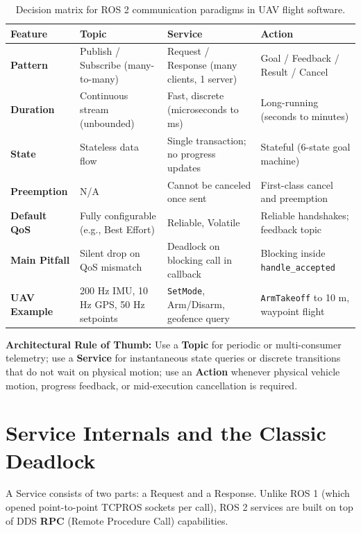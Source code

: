 \documentclass{article}
\begin{document}
\begin{table}[h]
\centering
\small
\renewcommand{\arraystretch}{1.2}
\begin{tabularx}{\textwidth}{lXXX}
\toprule
\textbf{Feature} & \textbf{Topic} & \textbf{Service} & \textbf{Action} \\
\midrule
\textbf{Pattern} & Publish / Subscribe (many-to-many) & Request / Response (many clients, 1 server) & Goal / Feedback / Result / Cancel \\
\textbf{Duration} & Continuous stream (unbounded) & Fast, discrete (microseconds to ms) & Long-running (seconds to minutes) \\
\textbf{State} & Stateless data flow & Single transaction; no progress updates & Stateful (6-state goal machine) \\
\textbf{Preemption} & N/A & Cannot be canceled once sent & First-class cancel and preemption \\
\textbf{Default QoS} & Fully configurable (e.g., Best Effort) & Reliable, Volatile & Reliable handshakes; feedback topic \\
\textbf{Main Pitfall} & Silent drop on QoS mismatch & Deadlock on blocking call in callback & Blocking inside \texttt{handle\_accepted} \\
\textbf{UAV Example} & 200 Hz IMU, 10 Hz GPS, 50 Hz setpoints & \texttt{SetMode}, Arm/Disarm, geofence query & \texttt{ArmTakeoff} to 10 m, waypoint flight \\
\bottomrule
\end{tabularx}
\caption{Decision matrix for ROS 2 communication paradigms in UAV flight software.}
\end{table}

\textbf{Architectural Rule of Thumb:} Use a \textbf{Topic} for periodic or multi-consumer telemetry; use a \textbf{Service} for instantaneous state queries or discrete transitions that do not wait on physical motion; use an \textbf{Action} whenever physical vehicle motion, progress feedback, or mid-execution cancellation is required.

\section{Service Internals and the Classic Deadlock}
A Service consists of two parts: a Request and a Response. Unlike ROS 1 (which opened point-to-point TCPROS sockets per call), ROS 2 services are built on top of DDS \textbf{RPC} (Remote Procedure Call) capabilities.
\end{document}
